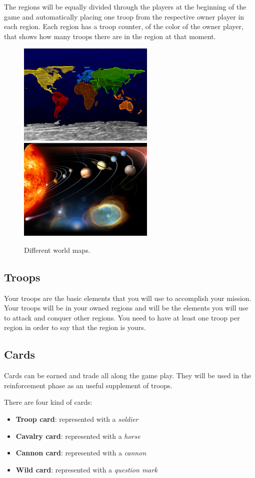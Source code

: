 \documentclass[12pt,a4paper]{article}
\begin{document}
The regions will be equally divided through the players at the beginning of the game and automatically placing one troop from the respective owner player in each region. Each region has a troop counter, of the color of the owner player, that shows how many troops there are in the region at that moment.

\begin{figure}[h!]
\centering
\includegraphics[width=6.5cm]{pic/map01.png}
\includegraphics[width=6.5cm]{pic/map02.png}
\caption{Different world maps.}
\label{fig:map}
\end{figure}

\subsection{Troops}
Your troops are the basic elements that you will use to accomplish your mission. Your troops will be in your owned regions and will be the elements you will use to attack and conquer other regions. You need to have at least one troop per region in order to say that the region is yours.

\subsection{Cards}
Cards can be earned and trade all along the game play. They will be used in the reinforcement phase as an useful supplement of troops.

There are four kind of cards:

\begin{itemize}
\item {\bf Troop card}: represented with a {\it soldier}
\item {\bf Cavalry card}: represented with a {\it horse}
\item {\bf Cannon card}: represented with a {\it cannon}
\item {\bf Wild card}: represented with a {\it question mark}
\end{itemize}
\end{document}
